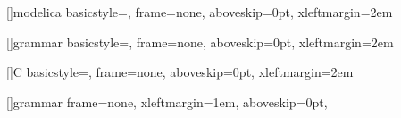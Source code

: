 []{modelica}{%
  basicstyle=\upshape\ttfamily,              %
  frame=none,
  aboveskip=0pt,
  xleftmargin=2em
}

[]{grammar}{%
  basicstyle=\upshape\ttfamily,              %
  frame=none,
  aboveskip=0pt,
  xleftmargin=2em
}

[]{C}{%
  basicstyle=\upshape\ttfamily,              %
  frame=none,
  aboveskip=0pt,
  xleftmargin=2em
}

\newenvironment{synopsis}[1][modelica]{%
\lstset{language=[synopsis]#1}%
~\vspace{-\parskip}\par
}{%
}
\newenvironment{semantics}{%
\list{}{%
\setlength{\leftmargin}{1.5em}%
\setlength{\rightmargin}{1.5em}%
}\item[]%
}{%
\endlist
}

[]{grammar}{%
  frame=none,
  xleftmargin=1em,
  aboveskip=0pt,
}

\newenvironment{production}[1]{%
\lstset{language=production}%
\par\noindent\hypertarget{production_#1}{\lstinline!#1 :!}%
}{%
}

\newenvironment{production*}[1]{%
\lstset{language=production}%
\par\noindent\lstinline!#1 :!%
}{%
}

\newcommand{\productionref}[1]{%
\hyperlink{production_#1}{{\lstinline[language=production]!#1!}}%
}

\newenvironment{lexicalunit}[1]{%
\lstset{language=production}%
\par\noindent\hypertarget{lexicalunit_#1}{\lstinline!#1 =!}%
}{%
}

\newenvironment{lexicalunit*}[1]{%
\lstset{language=production}%
\par\noindent\lstinline!#1 =!%
}{%
}

